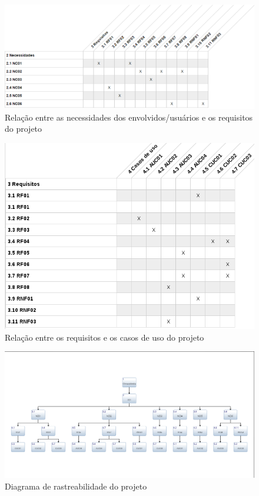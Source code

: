\begin{figure}[h!]
	\centering
	\includegraphics[width=\textwidth]{figuras/rastnec.png}
	\caption{Relação entre as necessidades dos envolvidos/usuários e os requisitos do projeto}
	\label{fig:rastnec}
\end{figure}

\begin{figure}[h!]
	\centering
	\includegraphics[width=\textwidth]{figuras/rastuc.png}
	\caption{Relação entre os requisitos e os casos de uso do projeto}
	\label{fig:rastuc}
\end{figure}

\begin{figure}[h!]
	\centering
	\includegraphics[width=\textwidth]{figuras/diag.png}
	\caption{Diagrama de rastreabilidade do projeto}
	\label{fig:diag}
\end{figure}